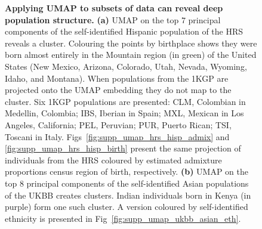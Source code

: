 \begin{figure}[ht]
\begin{subfigure}{0.49\columnwidth}
    \caption{}
        \label{fig:umap_ukbb_indian}
    \end{subfigure}
    \caption[Applying UMAP to subsets of data can reveal deep population structure]{\textbf{Applying UMAP to subsets of data can reveal deep population structure.} \textbf{(a)} UMAP on the top $7$ principal components of the self-identified Hispanic population of the HRS reveals a cluster. Colouring the points by birthplace shows they were born almost entirely in the Mountain region (in green) of the United States (New Mexico, Arizona, Colorado, Utah, Nevada, Wyoming, Idaho, and Montana). When populations from the 1KGP are projected onto the UMAP embedding they do not map to the cluster. Six 1KGP populations are presented:
    CLM, Colombian in Medellin, Colombia;
    IBS, Iberian in Spain;
    MXL, Mexican in Los Angeles, California;
    PEL, Peruvian;
    PUR, Puerto Rican;
    TSI, Toscani in Italy. Figs~\ref{fig:supp_umap_hrs_hisp_admix} and \ref{fig:supp_umap_hrs_hisp_birth} present the same projection of individuals from the HRS coloured by estimated admixture proportions census region of birth, respectively. \textbf{(b)} UMAP on the top $8$ principal components of the self-identified Asian populations of the UKBB creates clusters. Indian individuals born in Kenya (in purple) form one such cluster. A version coloured by self-identified ethnicity is presented in Fig~\ref{fig:supp_umap_ukbb_asian_eth}.}
    \label{fig:fig2}
\end{figure}

\clearpage

